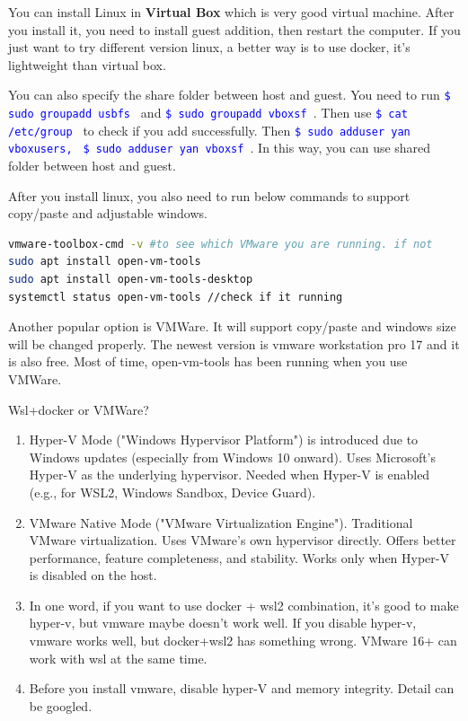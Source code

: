 \documentclass[paper=8.5in:11in, twoside, 12pt, pagesize=pdftex]{book}
\newcommand{\linuxcommand}[1]{\texttt{\textcolor{blue}{\$ #1 \Pisymbol{psy}{191}}}}
\begin{document}
You can install Linux in \textbf{Virtual Box} which is very good virtual machine. After you install it, you need to install guest addition, then restart the computer. If you just want to try different version linux, a better way is to use docker, it's lightweight than virtual box. 

	\par You can also specify the share folder between host and guest. You need to run \linuxcommand{sudo groupadd usbfs} and \linuxcommand{sudo groupadd vboxsf}. Then use \linuxcommand{cat /etc/group} to check if you add successfully. Then \linuxcommand{sudo adduser yan vboxusers,} \linuxcommand{sudo adduser yan vboxsf}. In this way, you can use shared folder between host and guest. 

	\par After you install linux, you also need to run below commands to support copy/paste and adjustable windows. 

\begin{lstlisting}[language=bash]
vmware-toolbox-cmd -v #to see which VMware you are running. if not
sudo apt install open-vm-tools
sudo apt install open-vm-tools-desktop	
systemctl status open-vm-tools //check if it running
\end{lstlisting}

	\par Another popular option is VMWare. It will support copy/paste and windows size will be changed properly. The newest version is vmware workstation pro 17 and it is also free. Most of time, open-vm-tools has been running when you use VMWare. 

	\par Wsl+docker or VMWare? 

\begin{enumerate}
	\item Hyper-V Mode ("Windows Hypervisor Platform") is introduced due to Windows updates (especially from Windows 10 onward). Uses Microsoft's Hyper-V as the underlying hypervisor.  Needed when Hyper-V is enabled (e.g., for WSL2, Windows Sandbox, Device Guard).

	\item VMware Native Mode ("VMware Virtualization Engine"). Traditional VMware virtualization. Uses VMware's own hypervisor directly. Offers better performance, feature completeness, and stability. Works only when Hyper-V is disabled on the host.

	\item In one word, if you want to use docker + wsl2 combination, it's good to make hyper-v, but vmware maybe doesn't work well. If you disable hyper-v, vmware works well, but docker+wsl2 has something wrong.  VMware 16+ can work with wsl at the same time. 
	
	\item Before you install vmware, disable hyper-V and memory integrity. Detail can be googled.
\end{enumerate}
\end{document}
